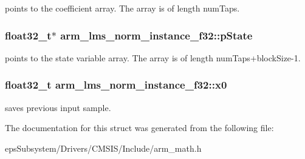 points to the coefficient array. The array is of length num\-Taps. \hypertarget{structarm__lms__norm__instance__f32_a0bc03338687002ed5f2e4a363eb095ec}{
\subsubsection[{p\-State}]{\setlength{\rightskip}{0pt plus 5cm}float32\-\_\-t$\ast$ arm\-\_\-lms\-\_\-norm\-\_\-instance\-\_\-f32\-::p\-State}}\label{structarm__lms__norm__instance__f32_a0bc03338687002ed5f2e4a363eb095ec}
points to the state variable array. The array is of length num\-Taps+block\-Size-\/1. \hypertarget{structarm__lms__norm__instance__f32_aec958fe89b164a30f38bcca9f5d96218}{
\subsubsection[{x0}]{\setlength{\rightskip}{0pt plus 5cm}float32\-\_\-t arm\-\_\-lms\-\_\-norm\-\_\-instance\-\_\-f32\-::x0}}\label{structarm__lms__norm__instance__f32_aec958fe89b164a30f38bcca9f5d96218}
saves previous input sample. 

The documentation for this struct was generated from the following file\-:\begin{DoxyCompactItemize}
\item 
eps\-Subsystem/\-Drivers/\-C\-M\-S\-I\-S/\-Include/arm\-\_\-math.\-h\end{DoxyCompactItemize}
